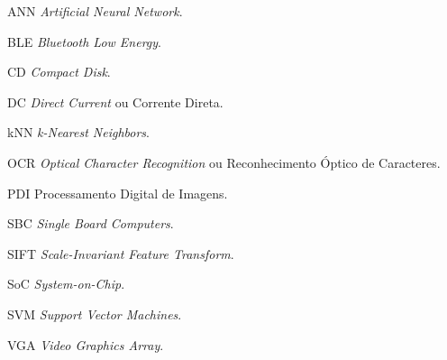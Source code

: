\begin{siglas}
  \item[ANN] 	\textit{Artificial Neural Network}.
  \item[BLE] 	\textit{Bluetooth Low Energy}.
  \item[CD] 	\textit{Compact Disk}.
  \item[DC] 	\textit{Direct Current} ou Corrente Direta.
  \item[kNN] 	\textit{k-Nearest Neighbors}.
  \item[OCR] 	\textit{Optical Character Recognition} ou Reconhecimento Óptico de Caracteres.
  \item[PDI]	Processamento Digital de Imagens.
  \item[SBC] 	\textit{Single Board Computers}.
  \item[SIFT]   \textit{Scale-Invariant Feature Transform}.
  \item[SoC] 	\textit{System-on-Chip}.
  \item[SVM] 	\textit{Support Vector Machines}.
  \item[VGA] 	\textit{Video Graphics Array}.
\end{siglas}

